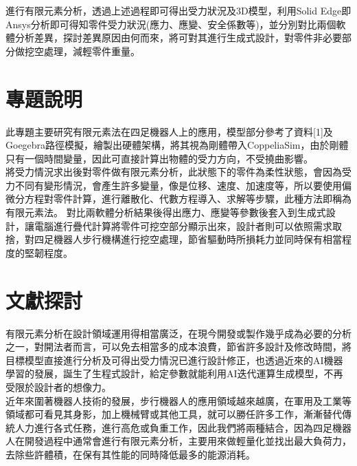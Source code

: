 進行有限元素分析，透過上述過程即可得出受力狀況及3D模型，利用Solid Edge即Ansys分析即可得知零件受力狀況(應力、應變、安全係數等)，並分別對比兩個軟體分析差異，探討差異原因由何而來，將可對其進行生成式設計，對零件非必要部分做挖空處理，減輕零件重量。

\section{專題說明}
此專題主要研究有限元素法在四足機器人上的應用，模型部分參考了資料[1]及Goegebra路徑模擬，繪製出硬體架構，將其視為剛體帶入CoppeliaSim，由於剛體只有一個時間變量，因此可直接計算出物體的受力方向，不受撓曲影響。\\

將受力情況求出後對零件做有限元素分析，此狀態下的零件為柔性狀態，會因為受力不同有變形情況，會產生許多變量，像是位移、速度、加速度等，所以要使用偏微分方程對零件計算，進行離散化、代數方程導入、求解等步驟，此種方法即稱為有限元素法。
對比兩軟體分析結果後得出應力、應變等參數後套入到生成式設計，讓電腦進行疊代計算將零件可挖空部分顯示出來，設計者則可以依照需求取捨，對四足機器人步行機構進行挖空處理，節省驅動時所損耗力並同時保有相當程度的堅韌程度。\\

\section{文獻探討}

有限元素分析在設計領域運用得相當廣泛，在現今開發或製作幾乎成為必要的分析之一，對開法者而言，可以免去相當多的成本浪費，節省許多設計及修改時間，將目標模型直接進行分析及可得出受力情況已進行設計修正，也透過近來的AI機器學習的發展，誕生了生程式設計，給定參數就能利用AI迭代運算生成模型，不再受限於設計者的想像力。\\

近年來圍著機器人技術的發展，步行機器人的應用領域越來越廣，在軍用及工業等領域都可看見其身影，加上機械臂或其他工具，就可以勝任許多工作，漸漸替代傳統人力進行各式任務，進行高危或負重工作，因此我們將兩種結合，因為四足機器人在開發過程中通常會進行有限元素分析，主要用來做輕量化並找出最大負荷力，去除些許體積，在保有其性能的同時降低最多的能源消耗。\\

\renewcommand{\baselinestretch}{0.5} %
